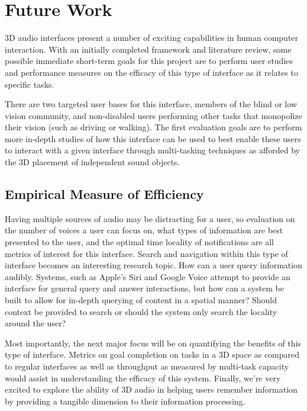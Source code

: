 \newpage                                                  \chapter{Future Work}

3D audio interfaces present a number of exciting capabilities in human computer
interaction. With an initially completed framework and literature review, some 
possible immediate short-term goals for this project are to perform user studies
and performance measures on the efficacy of this type of interface as it relates
to specific tasks.

There are two targeted user bases for this interface, members of the blind or low
vision community, and non-disabled users performing other tasks that monopolize 
their vision (such as driving or walking). The first evaluation goals are to 
perform more in-depth studies of how this interface can be used to best enable 
these users to interact with a given interface through multi-tasking techniques 
as afforded by the 3D placement of independent sound objects.

\section{                  Empirical Measure of Efficiency                    }

Having multiple sources of audio may be distracting for a user, so evaluation on
the number of voices a user can focus on, what types of information are best
presented to the user, and the optimal time locality of notifications are all 
metrics of interest for this interface. Search and navigation within this type
of interface becomes an interesting research topic.  How can a user query 
information audibly. Systems, such as Apple’s Siri and Google Voice attempt 
to provide an interface for general query and answer interactions, but how can
a system be built to allow for in-depth querying of content in a spatial manner?
Should context be provided to search or should the system only search the 
locality around the user?

Most importantly, the next major focus will be on quantifying the benefits of
this type of interface. Metrics on goal completion on tasks in a 3D space as
compared to regular interfaces as well as throughput as measured by multi-task
capacity would assist in understanding the efficacy of this system. Finally,
we’re very excited to explore the ability of 3D audio in helping users remember
information by providing a tangible dimension to their information processing.

